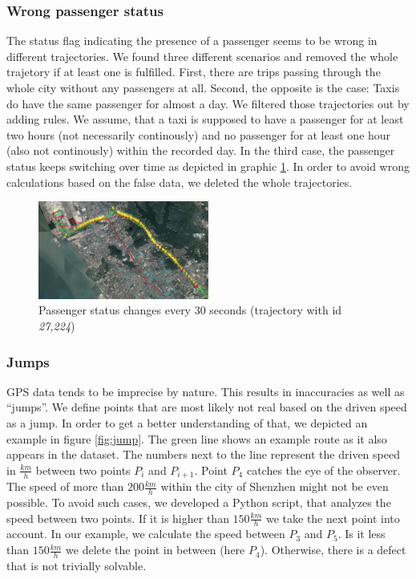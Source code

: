 \documentclass[10pt]{sig-alternate}
\newcommand{\quotes}[1]{``{#1}''}
\begin{document}
\subsubsection{Wrong passenger status}
The status flag indicating the presence of a passenger seems to be wrong in different trajectories. We found three different scenarios and removed the whole trajetory if at least one is fulfilled. First, there are trips passing through the whole city without any passengers at all. Second, the opposite is the case: Taxis do have the same passenger for almost a day. We filtered those trajectories out by adding rules. We assume, that a taxi is supposed to have a passenger for at least two hours (not necessarily continously) and no passenger for at least one hour (also not continously) within the recorded day. In the third case, the passenger status keeps switching over time as depicted in graphic \ref{fig:passenger_status}. In order to avoid wrong calculations based on the false data, we deleted the whole trajectories.


\begin{figure}[ht]
\centering
\includegraphics[width=0.5\textwidth]{img/passenger_status.png}
\caption{Passenger status changes every 30 seconds (trajectory with id \textit{27,224})}
\label{fig:passenger_status}
\end{figure}


\subsubsection{Jumps}
GPS data tends to be imprecise by nature. This results in inaccuracies as well as \quotes{jumps}. We define points that are most likely not real based on the driven speed as a jump. In order to get a better understanding of that, we depicted an example in figure \ref{fig:jump}. The green line shows an example route as it also appears in the dataset. The numbers next to the line represent the driven speed in $\frac{km}{h}$ between two points $P_i$ and $P_{i+1}$. Point $P_4$ catches the eye of the observer. The speed of more than $200\frac{km}{h}$ within the city of Shenzhen might not be even possible. To avoid such cases, we developed a Python script, that analyzes the speed between two points. If it is higher than $150\frac{km}{h}$ we take the next point into account. In our example, we calculate the speed between $P_3$ and $P_5$. Is it less than $150\frac{km}{h}$ we delete the point in between (here $P_4$). Otherwise, there is a defect that is not trivially solvable.
\end{document}
